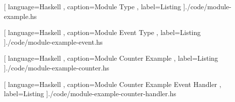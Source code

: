 \begin{center}
  
   [ language=Haskell
   , caption={Module Type}
   , label=Listing
   ]{./code/module-example.hs}
\end{center}

\begin{center}
  
    [ language=Haskell
    , caption={Module Event Type}
    , label=Listing
    ]{./code/module-example-event.hs}
\end{center}

\begin{center}
  
    [ language=Haskell
    , caption={Module Counter Example}
    , label=Listing
    ]{./code/module-example-counter.hs}
\end{center}

\begin{center}
  
    [ language=Haskell
    , caption={Module Counter Example Event Handler}
    , label=Listing
    ]{./code/module-example-counter-handler.hs}
\end{center}

